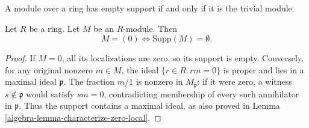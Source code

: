 \begin{lemma}
\label{editorial-source-lemma-support-zero}
\begin{slogan}
A module over a ring has empty support if and only if it is the trivial module.
\end{slogan}
Let $R$ be a ring. Let $M$ be an $R$-module. Then
$$
M = (0) \Leftrightarrow \text{Supp}(M) = \emptyset.
$$
\end{lemma}

\begin{proof}
If $M=0$, all its localizations are zero, so its support
is empty. Conversely, for any original nonzero $m\in M$,
the ideal $\{r\in R:rm=0\}$ is proper and lies in a
maximal ideal $\mathfrak p$. The fraction $m/1$ is nonzero
in $M_{\mathfrak p}$: if it were zero, a witness
$s\notin\mathfrak p$ would satisfy $sm=0$, contradicting
membership of every such annihilator in $\mathfrak p$.
Thus the support contains a maximal ideal, as also proved
in Lemma \ref{algebra-lemma-characterize-zero-local}.
\end{proof}